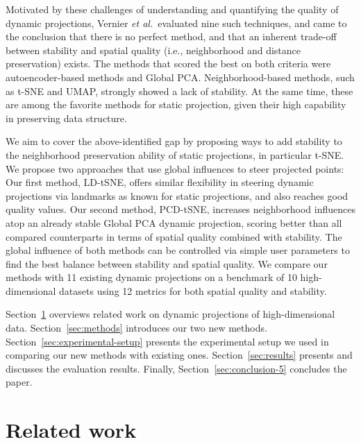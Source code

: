 Motivated by these challenges of understanding and quantifying the quality of dynamic projections, Vernier \emph{et al.}\,\cite{Vernier2020} evaluated nine such techniques, and came to the conclusion that there is no perfect method, and that an inherent trade-off between stability and spatial quality (i.e., neighborhood and distance preservation) exists. The methods that scored the best on both criteria were autoencoder-based methods and Global PCA. Neighborhood-based methods, such as t-SNE and UMAP, strongly showed a lack of stability. At the same time, these are among the favorite methods for static projection, given their high capability in preserving data structure.

We aim to cover the above-identified gap by proposing ways to add stability to the neighborhood preservation ability of static projections, in particular t-SNE. We propose two approaches that use global influences to steer projected points:
Our first method, LD-tSNE, offers similar flexibility in steering dynamic projections via landmarks as known for static projections, and also reaches good quality values. Our second method, PCD-tSNE, increases neighborhood influences atop an already stable Global PCA dynamic projection, scoring better than all compared counterparts in terms of spatial quality combined with stability. The global influence of both methods can be controlled via simple user parameters to find the best balance between stability and spatial quality. We compare our methods with 11 existing dynamic projections on a benchmark of 10 high-dimensional datasets using 12 metrics for both spatial quality and stability. 

Section~\ref{sec:background} overviews related work on dynamic projections of high-dimensional data. Section~\ref{sec:methods} introduces our two new methods. Section~\ref{sec:experimental-setup} presents the experimental setup we used in comparing our new methods with existing ones. Section~\ref{sec:results} presents and discusses the evaluation results. Finally, Section~\ref{sec:conclusion-5} concludes the paper.

  
\vspace{-0.15cm}
\section{Related work}
\label{sec:background}

